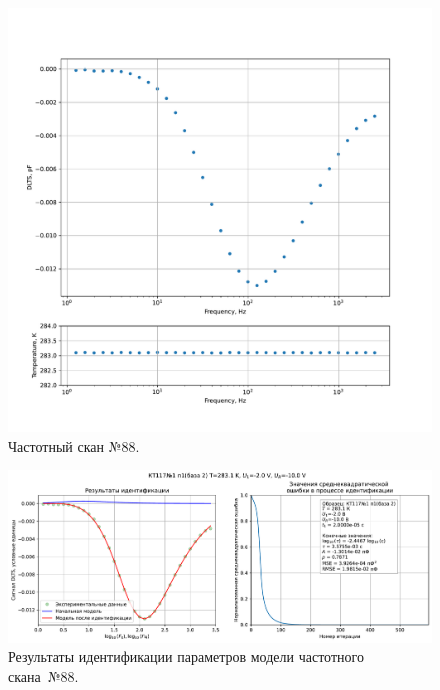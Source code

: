 \begin{figure}[!ht]
    \centering
    \includegraphics[width=1\textwidth]{../plots/КТ117№1_п1(база 2)_2500Гц-1Гц_1пФ_+10С_-2В-10В_200мВ_20мкс_шаг_0,1.pdf}
    \caption{Частотный скан №88.}
    \label{pic:frequency_scan_88}
\end{figure}

\begin{figure}[!ht]
    \centering
    \includegraphics[width=1\textwidth]{../plots/КТ117№1_п1(база 2)_2500Гц-1Гц_1пФ_+10С_-2В-10В_200мВ_20мкс_шаг_0,1_model.pdf}
    \caption{Результаты идентификации параметров модели частотного скана~№88.}
    \label{pic:frequency_scan_model88}
\end{figure}

\pagebreak


